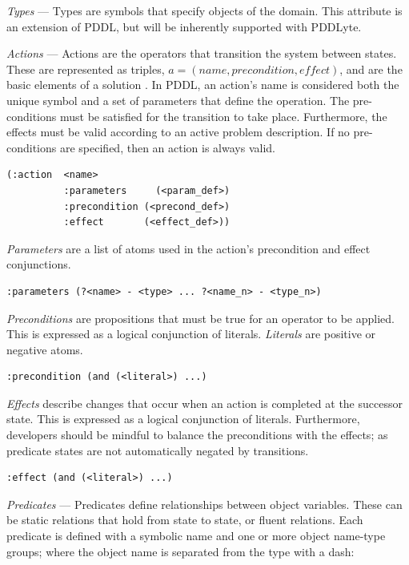 \documentclass[
a4paper, %
11pt, %
onecolumn, %
openany, %
]{memoir}
\begin{document}
{\textit{Types} --- Types are symbols that specify objects of the domain. This attribute is an extension of PDDL, but will be inherently supported with PDDLyte.

\textit{Actions} --- Actions are the operators that transition the system between states. These are represented as triples, $a = (name, precondition, effect)$, and are the basic elements of a solution \cite{strips70}. In PDDL, an action's name is considered both the unique symbol and a set of parameters that define the operation. The pre-conditions must be satisfied for the transition to take place. Furthermore, the effects must be valid according to an active problem description. If no pre-conditions are specified, then an action is always valid. 

\begin{lstlisting}
(:action  <name>
          :parameters     (<param_def>)
          :precondition (<precond_def>)
          :effect       (<effect_def>))
\end{lstlisting}

\textit{Parameters} are a list of atoms used in the action's precondition and effect conjunctions.

\begin{lstlisting}
:parameters (?<name> - <type> ... ?<name_n> - <type_n>)
\end{lstlisting}

\textit{Preconditions} are propositions that must be true for an operator to be applied. This is expressed as a logical conjunction of literals. \textit{Literals} are positive or negative atoms.

\begin{lstlisting}
:precondition (and (<literal>) ...)
\end{lstlisting}

\textit{Effects} describe changes that occur when an action is completed at the successor state. This is expressed as a logical conjunction of literals. Furthermore, developers should be mindful to balance the preconditions with the effects; as predicate states are not automatically negated by transitions.

\begin{lstlisting}
:effect (and (<literal>) ...)
\end{lstlisting}

\textit{Predicates} --- Predicates define relationships between object variables. These can be static relations that hold from state to state, or fluent relations. Each predicate is defined with a symbolic name and one or more object name-type groups; where the object name is separated from the type with a dash:

}
\end{document}
